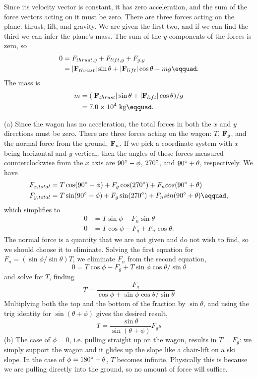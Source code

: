 Since its velocity vector is constant, it has zero
acceleration, and the sum of the force vectors acting on it
must be zero. There are three forces acting on the plane:
thrust, lift, and gravity. We are given the first two, and
if we can find the third we can infer the plane's mass. The sum of
the $y$ components of the forces is zero, so
\begin{align*}
	0	&= F_{thrust,y} +F_{lift,y} +F_{g,y} \\
		&= |\zb{F}_{thrust}| \sin \theta + |\zb{F}_{lift}| \cos \theta - mg\eqquad.
\end{align*}
The mass is
\begin{align*}
	m	&= (|\zb{F}_{thrust}| \sin \theta + |\zb{F}_{lift}| \cos \theta) / g \\
		&= 7.0\times10^4\ \kgunit\eqquad.
\end{align*}

(a) Since the wagon has no acceleration, the total
forces in both the $x$ and $y$ directions must be zero. There
are three forces acting on the wagon: $T$, $\textbf{F}_g$, and the normal
force from the ground, $\textbf{F}_n$. If we pick a coordinate system
with $x$ being horizontal and $y$ vertical, then the angles of
these forces measured counterclockwise from the $x$ axis are
$90\mspace{0mu}^\circ-\phi$, $270\mspace{0mu}^\circ$, and $90\mspace{0mu}^\circ+\theta$, respectively.
We have
\begin{align*}
	F_{x,total} &= T\cos(90\degunit-\phi) + F_{g}\cos(270\degunit) +
				F_ncos(90\degunit+\theta) \\
	F_{y,total} &= T\sin(90\degunit-\phi) + F_{g}\sin(270\degunit) +
				F_nsin(90\degunit+\theta)\eqquad,
\end{align*}
which simplifies to
\begin{align*}
	0 &= T \sin \phi - F_n \sin \theta\\
	0 &= T \cos \phi  - F_{g} + F_n \cos \theta  .
\end{align*}
The normal force is a quantity that we are not given and do
not wish to find, so we should choose it to eliminate.
Solving the first equation for $F_n=(\sin \phi/\sin \theta)T$, we
eliminate $F_n$ from the second equation,
\begin{equation*}
	0 = T \cos \phi  - F_{g} + T \sin \phi \cos \theta/\sin \theta
\end{equation*}
and solve for $T$, finding
\begin{equation*}
	T = \frac{F_g}{\cos\phi+\sin\phi\cos\theta/\sin\theta}
\end{equation*}
Multiplying both the top and the bottom of the fraction by
$\sin \theta$, and using the trig identity for $\sin(\theta+\phi)$ gives the
desired result,
\begin{equation*}
	T = \frac{\sin\theta}{\sin(\theta+\phi)}F_gs
\end{equation*}
(b) The case of $\phi=0$, i.e. pulling straight up on the wagon,
results in $T=F_{g}$: we simply support the wagon and it glides
up the slope like a chair-lift on a ski slope. In the case
of $\phi=180\mspace{0mu}^\circ-\theta$, $T$ becomes infinite. Physically this is
because we are pulling directly into the ground, so no
amount of force will suffice.

